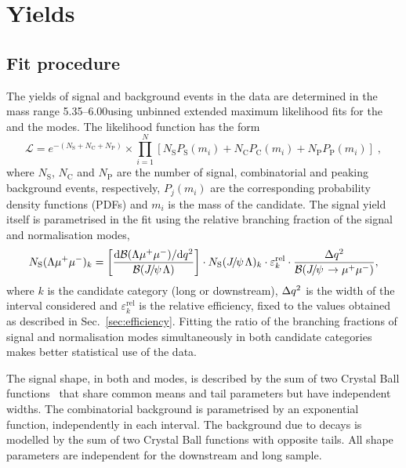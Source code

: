 \section{Yields}

\subsection{Fit procedure}
 The yields of signal and background events in the data are
 determined in the mass range 5.35--6.00\gevcc using unbinned
 extended maximum likelihood fits for the \decay{\Lb}{\Lz\mumu} and
 the \decay{\Lb}{\jpsi\Lz} modes.  The likelihood function has the form
\begin{equation}
\mathcal{L}=e^{-(N_\mathrm{S}+N_\mathrm{C}+N_{\mathrm{P}})} \times \prod_{i=1}^{N}[
  N_\mathrm{S}P_{\mathrm{S}}(m_i)+N_\mathrm{C}P_\mathrm{C}(m_i)+N_{\mathrm{P}}P_{\mathrm{P}}(m_i)]
 \;,
\label{eq:uml}
\end{equation}
 \noindent where $N_\mathrm{S}$, $N_\mathrm{C}$ and $N_\mathrm{P}$ are
 the number of
 signal, combinatorial and peaking background events, respectively, 
 $P_j(m_i)$ are the corresponding probability density functions
 (PDFs) and $m_i$  is the mass of the \Lb candidate. 
 The signal yield itself is parametrised in the fit using the
 relative branching fraction of the signal and normalisation modes,
%
\begin{equation}
N_\mathrm{S}({\Lambda}{\mu^+\mu^-})_{k}  = \left[ \frac{\mathrm{d}\mathcal{B}({\Lambda}{\mu^+\mu^-})/\mathrm{d}{q^2}}{\mathcal{B}({{J\mskip -3mu/\mskip -2mu\psi\mskip 2mu}}{\Lambda})} \right]  \cdot
N_\mathrm{S}({{J\mskip -3mu/\mskip -2mu\psi\mskip 2mu}}{\Lambda})_{k} \cdot \varepsilon^{\mathrm{rel}}_{k} \cdot \frac {\Delta{\ensuremath{q^2}}} { \mathcal{B}({{J\mskip -3mu/\mskip -2mu\psi\mskip 2mu}}\rightarrow{\ensuremath{\mu^+\mu^-}}) },
\label{eq:ield_from_BR}
\end{equation}
\noindent
where $k$ is the candidate category (long or downstream), $\Delta{\ensuremath{q^2}}$
is the width of the \qsq interval considered and
$\varepsilon_k^{\mathrm{rel}}$ is the relative efficiency, fixed to
the values obtained as described in Sec.~\ref{sec:efficiency}. Fitting
the ratio of the branching fractions of signal and normalisation modes
simultaneously in both candidate categories makes better statistical
use of the data.

 The signal shape, in both \decay{\Lb}{\Lz\mumu} and
 \decay{\Lb}{\jpsi\Lz} modes, is described by the sum of two Crystal
 Ball functions~\cite{Skwarnicki:1986xj} that share common means and
 tail parameters but have independent widths.  The combinatorial
 background is parametrised by an exponential function, independently
 in each \qsq interval. The background due to \decay{\Bz}{\jpsi\KS}
 decays is modelled by the sum of two Crystal Ball functions with
 opposite tails. All shape parameters are independent
 for the downstream and long sample.

